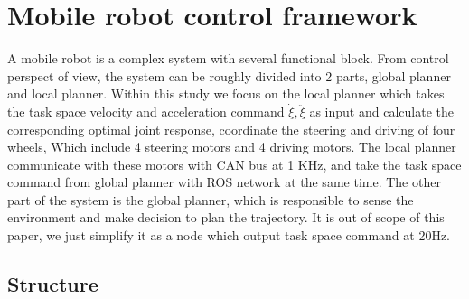\chapter{Mobile robot control framework}
\label{cha:framework}
A mobile robot is a complex system with several functional block. From control perspect of view, the system can be roughly divided into 2 parts, global planner and local planner.
Within this study we focus on the local planner which takes the task space velocity and acceleration command $\dot{\xi},\ddot{\xi}$ as input and calculate the corresponding optimal joint response, coordinate the steering and driving of four wheels, Which include 4 steering motors and 4 driving motors. The local planner communicate with these motors with CAN bus at 1 KHz, and take the task space command from global planner with ROS network at the same time.
The other part of the system is the global planner, which is responsible to sense the environment and make decision to plan the trajectory. It is out of scope of this paper, we just simplify it as a node which output task space command at 20Hz.



\section{Structure}
\label{sec:structure}

